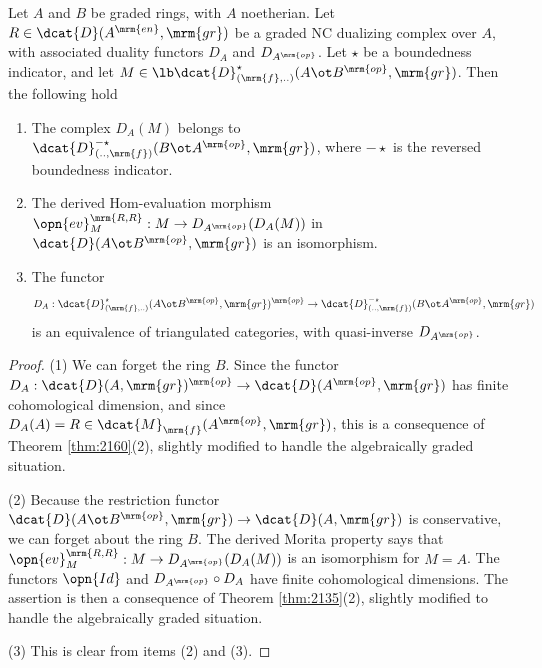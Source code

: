 \begin{thm} \label{thm:3820}
Let $A$ and $B$ be graded rings, with $A$ noetherian.
Let $R \in \dcat{D}(A^{\mrm{en}}, \mrm{gr})$ be a graded NC 
dualizing complex over $A$, with associated duality functors $D_A$ and 
$D_{A^{\mrm{op}}}$. Let $\star$ be a boundedness indicator, and let 
$M \in \lb \dcat{D}^{\star}_{(\mrm{f}, ..)}(A \ot B^{\mrm{op}}, \mrm{gr})$.
Then the following hold\tup{:}
\begin{enumerate}
\item The complex $D_A(M)$ belongs to 
$\dcat{D}^{-\star}_{(.., \mrm{f})}(B \ot A^{\mrm{op}}, \mrm{gr})$, 
where $-\star$ is the reversed boundedness indicator.

\item The derived Hom-evaluation morphism 
$\opn{ev}^{\mrm{R, R}}_{M} : M \to D_{A^{\mrm{op}}}(D_{A}(M))$
in $\dcat{D}(A \ot B^{\mrm{op}}, \mrm{gr})$ is an isomorphism. 

\item The functor
\[ D_{A} : 
\dcat{D}^{\star}_{(\mrm{f}, ..)}(A \ot B^{\mrm{op}}, \mrm{gr})^{\mrm{op}} \to
\dcat{D}^{-\star}_{(.., \mrm{f})}(B \ot A^{\mrm{op}}, 
\mrm{gr}) \]
is an equivalence of triangulated categories, with quasi-inverse 
$D_{A^{\mrm{op}}}$. 
\end{enumerate}
\end{thm}

\begin{proof} \mbox{}

\smallskip \noindent
(1) We can forget the ring $B$. Since the functor 
$D_A : \dcat{D}(A, \mrm{gr})^{\mrm{op}} \to \dcat{D}(A^{\mrm{op}}, \mrm{gr})$
has finite cohomological dimension, and since
$D_A(A) = R \in \dcat{M}_{\mrm{f}}(A^{\mrm{op}}, \mrm{gr})$,
this is a consequence of Theorem \ref{thm:2160}(2), slightly 
modified to handle the algebraically graded situation. 

\medskip \noindent 
(2) Because the restriction functor 
$\dcat{D}(A \ot B^{\mrm{op}}, \mrm{gr}) \to \dcat{D}(A, \mrm{gr})$
is conservative, we can forget about the ring $B$. The derived Morita 
property says that 
$\opn{ev}^{\mrm{R, R}}_{M} : M \to D_{A^{\mrm{op}}}(D_{A}(M))$
is an isomorphism for $M = A$. The functors $\opn{Id}$ and 
$D_{A^{\mrm{op}}} \circ D_{A}$
have finite cohomological dimensions. The assertion is then a consequence of 
Theorem \ref{thm:2135}(2), slightly modified to handle 
the algebraically graded situation. 

\medskip \noindent 
(3) This is clear from items (2) and (3).
\end{proof}

